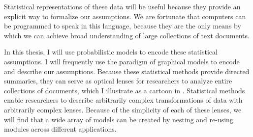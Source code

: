 Statistical representations of these data will be useful because they
provide an explicit way to formalize our assumptions.  We are
fortunate that computers can be programmed to speak in this language,
because they are the only means by which we can achieve broad
understanding of large collections of text documents.

In this thesis, I will use probabilistic models to encode these
statistical assumptions.  I will frequently use the paradigm of
graphical models \citep{pearl:1985} to encode and describe our
assumptions.  Because these statistical methods provide directed
summaries, they can serve as optical lenses for researchers to analyze
entire collections of documents, which I illustrate as a cartoon in
.  Statistical methods enable researchers to
describe arbitrarily complex transformations of data with arbitrarily
complex lenses.  Because of the simplicity of each of these lenses,
we will find that a wide array of models can be created by nesting and
re-using modules across different applications.

